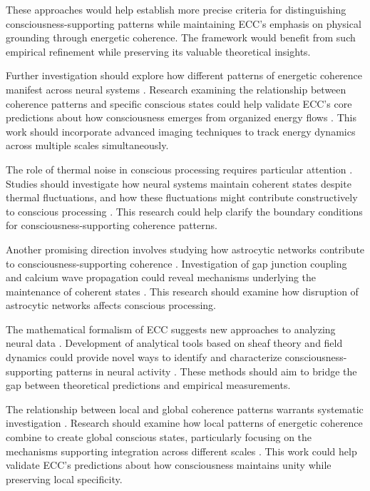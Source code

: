 These approaches would help establish more precise criteria for distinguishing consciousness-supporting patterns while maintaining ECC's emphasis on physical grounding through energetic coherence. The framework would benefit from such empirical refinement while preserving its valuable theoretical insights.

Further investigation should explore how different patterns of energetic coherence manifest across neural systems \cite{deacon2011incomplete}. Research examining the relationship between coherence patterns and specific conscious states could help validate ECC's core predictions about how consciousness emerges from organized energy flows \cite{koch2019feeling}. This work should incorporate advanced imaging techniques to track energy dynamics across multiple scales simultaneously.

The role of thermal noise in conscious processing requires particular attention \cite{rovelli2018order}. Studies should investigate how neural systems maintain coherent states despite thermal fluctuations, and how these fluctuations might contribute constructively to conscious processing \cite{penrose2016fashion}. This research could help clarify the boundary conditions for consciousness-supporting coherence patterns.

Another promising direction involves studying how astrocytic networks contribute to consciousness-supporting coherence \cite{rosen2012anticipatory}. Investigation of gap junction coupling and calcium wave propagation could reveal mechanisms underlying the maintenance of coherent states \cite{thompson2014waking}. This research should examine how disruption of astrocytic networks affects conscious processing.

The mathematical formalism of ECC suggests new approaches to analyzing neural data \cite{langer2009philosophy}. Development of analytical tools based on sheaf theory and field dynamics could provide novel ways to identify and characterize consciousness-supporting patterns in neural activity \cite{varela2016embodied}. These methods should aim to bridge the gap between theoretical predictions and empirical measurements.

The relationship between local and global coherence patterns warrants systematic investigation \cite{feinberg2016ancient}. Research should examine how local patterns of energetic coherence combine to create global conscious states, particularly focusing on the mechanisms supporting integration across different scales \cite{zahavi2014self}. This work could help validate ECC's predictions about how consciousness maintains unity while preserving local specificity.

